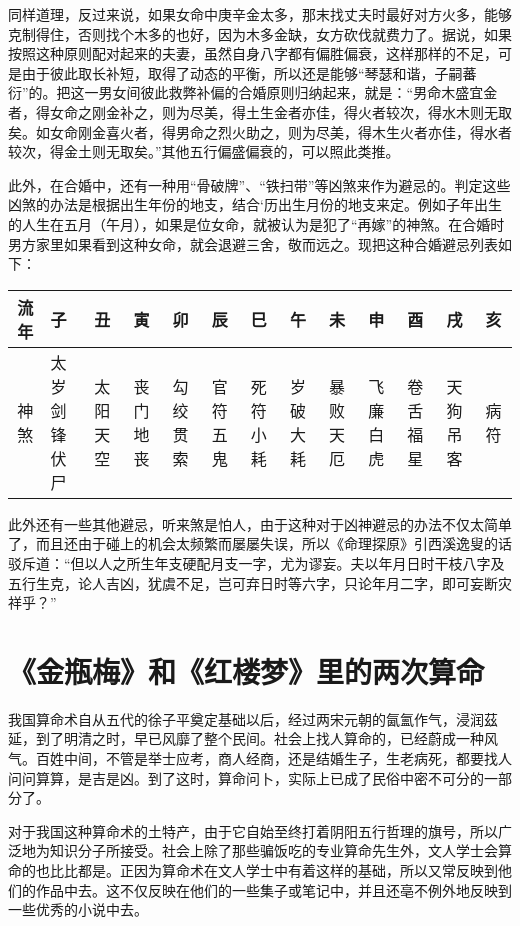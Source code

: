 \documentclass[a5paper,oneside,12pt]{ctexbook}
\begin{document}
同样道理，反过来说，如果女命中庚辛金太多，那末找丈夫时最好对方火多，能够克制得住，否则找个木多的也好，因为木多金缺，女方砍伐就费力了。据说，如果按照这种原则配对起来的夫妻，虽然自身八字都有偏胜偏衰，这样那样的不足，可是由于彼此取长补短，取得了动态的平衡，所以还是能够“琴瑟和谐，子嗣蕃衍”的。把这一男女间彼此救弊补偏的合婚原则归纳起来，就是：“男命木盛宜金者，得女命之刚金补之，则为尽美，得土生金者亦佳，得火者较次，得水木则无取矣。如女命刚金喜火者，得男命之烈火助之，则为尽美，得木生火者亦佳，得水者较次，得金土则无取矣。”其他五行偏盛偏衰的，可以照此类推。

此外，在合婚中，还有一种用“骨破牌”、“铁扫带”等凶煞来作为避忌的。判定这些凶煞的办法是根据出生年份的地支，结合‘历出生月份的地支来定。例如子年出生的人生在五月（午月），如果是位女命，就被认为是犯了“再嫁”的神煞。在合婚时男方家里如果看到这种女命，就会退避三舍，敬而远之。现把这种合婚避忌列表如下：

\begin{center}    
\setlength{\tabcolsep}{0em} %
\begin{tabular}[H]{c*{12}{|m{2em}<{\centering}}}
\hline
流年&子&丑&寅&卯&辰&巳&午&未&申&酉&戌&亥\\
\hline
神煞&太岁剑锋伏尸&太阳天空&丧门地丧&勾绞贯索&官符五鬼&死符小耗&岁破大耗&暴败天厄&飞廉白虎&卷舌福星&天狗吊客&病符\\
\hline
\end{tabular}
\end{center}

此外还有一些其他避忌，听来煞是怕人，由于这种对于凶神避忌的办法不仅太简单了，而且还由于碰上的机会太频繁而屡屡失误，所以《命理探原》引西溪逸叟的话驳斥道：“但以人之所生年支硬配月支一字，尤为谬妄。夫以年月日时干枝八字及五行生克，论人吉凶，犹虞不足，岂可弃日时等六字，只论年月二字，即可妄断灾祥乎？”

\section{《金瓶梅》和《红楼梦》里的两次算命}
我国算命术自从五代的徐子平奠定基础以后，经过两宋元朝的氤氳作气，浸润茲延，到了明清之时，早已风靡了整个民间。社会上找人算命的，已经蔚成一种风气。百姓中间，不管是举士应考，商人经商，还是结婚生子，生老病死，都要找人问问算算，是吉是凶。到了这时，算命问卜，实际上已成了民俗中密不可分的一部分了。

对于我国这种算命术的土特产，由于它自始至终打着阴阳五行哲理的旗号，所以广泛地为知识分子所接受。社会上除了那些骗饭吃的专业算命先生外，文人学士会算命的也比比都是。正因为算命术在文人学士中有着这样的基础，所以又常反映到他们的作品中去。这不仅反映在他们的一些集子或笔记中，并且还亳不例外地反映到一些优秀的小说中去。
\end{document}
